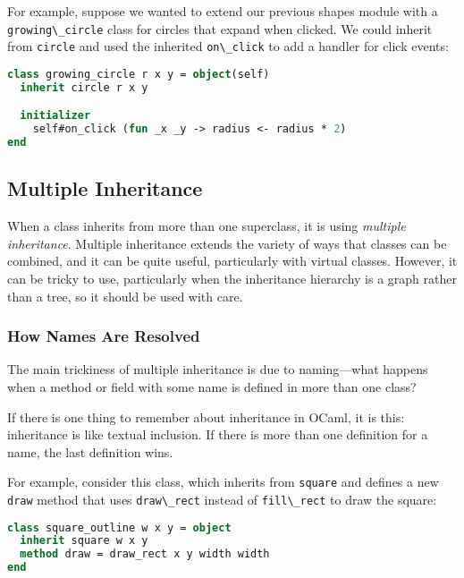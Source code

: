 For example, suppose we wanted to extend our previous shapes module with
a \passthrough{\lstinline!growing\_circle!} class for circles that
expand when clicked. We could inherit from
\passthrough{\lstinline!circle!} and used the inherited
\passthrough{\lstinline!on\_click!} to add a handler for click events:

\begin{lstlisting}[language=Caml]
class growing_circle r x y = object(self)
  inherit circle r x y

  initializer
    self#on_click (fun _x _y -> radius <- radius * 2)
end
\end{lstlisting}

\hypertarget{multiple-inheritance}{%
\subsection{Multiple Inheritance}\label{multiple-inheritance}}

When a class inherits from more than one superclass, it is using
\emph{multiple inheritance}. Multiple inheritance extends the variety of
ways that classes can be combined, and it can be quite useful,
particularly with virtual classes. However, it can be tricky to use,
particularly when the inheritance hierarchy is a graph rather than a
tree, so it should be used with care.

\hypertarget{how-names-are-resolved}{%
\subsubsection{How Names Are Resolved}\label{how-names-are-resolved}}

The main trickiness of multiple inheritance is due to naming---what
happens when a method or field with some name is defined in more than
one class?

If there is one thing to remember about inheritance in OCaml, it is
this: inheritance is like textual inclusion. If there is more than one
definition for a name, the last definition wins.

For example, consider this class, which inherits from
\passthrough{\lstinline!square!} and defines a new
\passthrough{\lstinline!draw!} method that uses
\passthrough{\lstinline!draw\_rect!} instead of
\passthrough{\lstinline!fill\_rect!} to draw the square:

\begin{lstlisting}[language=Caml]
class square_outline w x y = object
  inherit square w x y
  method draw = draw_rect x y width width
end
\end{lstlisting}


